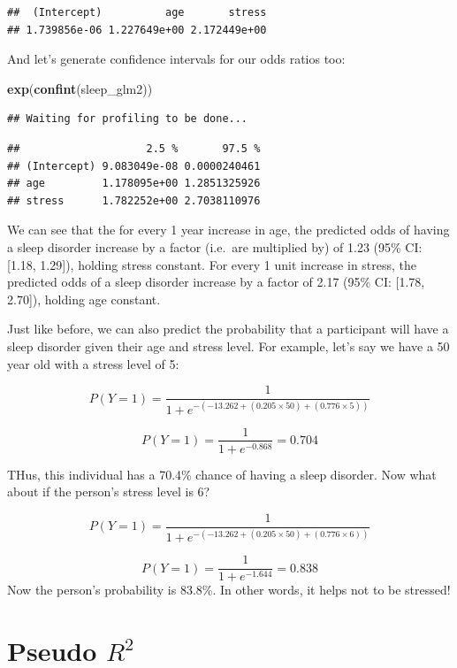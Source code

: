 \documentclass[
]{book}
\newenvironment{Shaded}{\begin{snugshade}}{\end{snugshade}}
\newcommand{\FunctionTok}[1]{\textcolor[rgb]{0.13,0.29,0.53}{\textbf{#1}}}
\newcommand{\NormalTok}[1]{#1}
\begin{document}
\begin{verbatim}
##  (Intercept)          age       stress 
## 1.739856e-06 1.227649e+00 2.172449e+00
\end{verbatim}

And let's generate confidence intervals for our odds ratios too:

\begin{Shaded}
\begin{Highlighting}[]
\FunctionTok{exp}\NormalTok{(}\FunctionTok{confint}\NormalTok{(sleep\_glm2))}
\end{Highlighting}
\end{Shaded}

\begin{verbatim}
## Waiting for profiling to be done...
\end{verbatim}

\begin{verbatim}
##                    2.5 %       97.5 %
## (Intercept) 9.083049e-08 0.0000240461
## age         1.178095e+00 1.2851325926
## stress      1.782252e+00 2.7038110976
\end{verbatim}

We can see that the for every 1 year increase in age, the predicted odds of having a sleep disorder increase by a factor (i.e.~are multiplied by) of 1.23 (95\% CI: {[}1.18, 1.29{]}), holding stress constant. For every 1 unit increase in stress, the predicted odds of a sleep disorder increase by a factor of 2.17 (95\% CI: {[}1.78, 2.70{]}), holding age constant.

Just like before, we can also predict the probability that a participant will have a sleep disorder given their age and stress level. For example, let's say we have a 50 year old with a stress level of 5:

\[
P(Y = 1) = \frac{1}{1 + e^{-(-13.262 + (0.205 \times 50) + (0.776 \times 5))}} 
\]

\[
P(Y = 1) = \frac{1}{1 + e^{-0.868}} = 0.704
\]

THus, this individual has a 70.4\% chance of having a sleep disorder. Now what about if the person's stress level is 6?

\[
P(Y = 1) = \frac{1}{1 + e^{-(-13.262 + (0.205 \times 50) + (0.776 \times 6))}} 
\]

\[
P(Y = 1) = \frac{1}{1 + e^{-1.644}} = 0.838
\]
Now the person's probability is 83.8\%. In other words, it helps not to be stressed!

\hypertarget{pseudo-r2}{%
\section{\texorpdfstring{Pseudo \(R^2\)}{Pseudo R\^{}2}}\label{pseudo-r2}}
\end{document}
